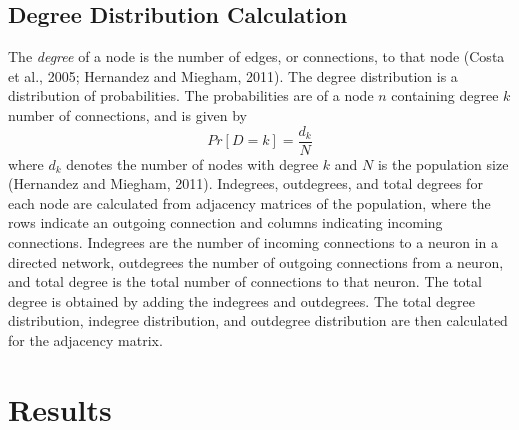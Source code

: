 \documentclass[11pt,titlepage]{article}
\begin{document}

\clearpage
\subsection{Degree Distribution Calculation}
The \textit{degree} of a node is the number of edges, or connections, to that node (Costa et al., 2005; Hernandez and Miegham, 2011). The degree distribution is a distribution of probabilities. The probabilities are of a node $n$ containing degree $k$ number of connections, and is given by $$Pr[D=k] = \frac{d_k}{N}$$ where $d_k$ denotes the number of nodes with degree $k$ and $N$ is the population size (Hernandez and Miegham, 2011). Indegrees, outdegrees, and total degrees for each node are calculated from adjacency matrices of the population, where the rows indicate an outgoing connection and columns indicating incoming connections. Indegrees are the number of incoming connections to a neuron in a directed network, outdegrees the number of outgoing connections from a neuron, and total degree is the total number of connections to that neuron. The total degree is obtained by adding the indegrees and outdegrees. The total degree distribution, indegree distribution, and outdegree distribution are then calculated for the adjacency matrix.\par
\newpage
\section{Results}
\end{document}
